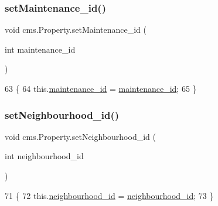 \subsubsection{\texorpdfstring{set\+Maintenance\+\_\+id()}{setMaintenance\_id()}}
{\footnotesize\ttfamily void cms.\+Property.\+set\+Maintenance\+\_\+id (\begin{DoxyParamCaption}\item[{int}]{maintenance\+\_\+id }\end{DoxyParamCaption})\hspace{0.3cm}{\ttfamily [inline]}}


\begin{DoxyCode}
63                                                       \{
64         this.\mbox{\hyperlink{classcms_1_1_property_a8da95f059e18d03376e179cbe5861043}{maintenance\_id}} = \mbox{\hyperlink{classcms_1_1_property_a8da95f059e18d03376e179cbe5861043}{maintenance\_id}};
65     \}
\end{DoxyCode}
\mbox{\label{classcms_1_1_property_ad09af4965ffd46ec8270d58e8d956e40}} 
\subsubsection{\texorpdfstring{set\+Neighbourhood\+\_\+id()}{setNeighbourhood\_id()}}
{\footnotesize\ttfamily void cms.\+Property.\+set\+Neighbourhood\+\_\+id (\begin{DoxyParamCaption}\item[{int}]{neighbourhood\+\_\+id }\end{DoxyParamCaption})\hspace{0.3cm}{\ttfamily [inline]}}


\begin{DoxyCode}
71                                                           \{
72         this.\mbox{\hyperlink{classcms_1_1_property_a68a7a76b323d88f8ddcc351265e7fd25}{neighbourhood\_id}} = \mbox{\hyperlink{classcms_1_1_property_a68a7a76b323d88f8ddcc351265e7fd25}{neighbourhood\_id}};
73     \}
\end{DoxyCode}
\mbox{\label{classcms_1_1_property_a30e854f22efcebf4069e9368cdc189df}} 

